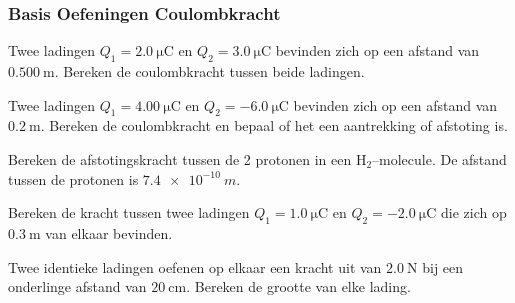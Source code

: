 \subsubsection*{Basis Oefeningen Coulombkracht}
\begin{oef}\label{oH1:s1}
Twee ladingen $Q_{1}=\qty{+2,0}{\micro\coulomb}$ en $Q_{2}=\qty{+3,0}{\micro\coulomb}$ bevinden zich op een afstand van $\qty{0,500}{\meter}$. Bereken de coulombkracht tussen beide ladingen.
\end{oef}

\begin{oef}\label{oH1:s2}
Twee ladingen $Q_{1}=\qty{+4,00}{\micro\coulomb}$ en $Q_{2}=\qty{-6,0}{\micro\coulomb}$ bevinden zich op een afstand van $\qty{0,2}{\meter}$. Bereken de coulombkracht en bepaal of het een aantrekking of afstoting is.
\end{oef}

\begin{oef}\label{oH1:H2}
Bereken de afstotingskracht tussen de 2 protonen in een $\text{H}_{2}$–molecule. De afstand tussen de protonen is $\qty{7,4e-10}{m}$.
\end{oef}

\begin{oef}\label{oH1:s3}
Bereken de kracht tussen twee ladingen $Q_{1}=\qty{+1,0}{\micro\coulomb}$ en $Q_{2}=\qty{-2,0}{\micro\coulomb}$ die zich op $\qty{0,3}{\meter}$ van elkaar bevinden.
\end{oef}

\begin{oef}\label{oH1:Q2}
	Twee identieke ladingen oefenen op elkaar een kracht uit van $\qty{2,0}{\newton}$ bij een onderlinge afstand van $\qty{20}{\centi\meter}$. Bereken de grootte van elke lading.
\end{oef}

